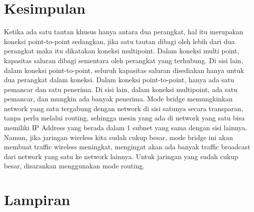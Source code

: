 \section{Kesimpulan}
Ketika ada satu tautan khusus hanya antara dua perangkat, hal itu merupakan koneksi point-to-point sedangkan, jika satu tautan dibagi oleh lebih dari dua perangkat maka itu dikatakan koneksi multipoint. Dalam koneksi multi point, kapasitas saluran dibagi sementara oleh perangkat yang terhubung. Di sisi lain, dalam koneksi point-to-point, seluruh kapasitas saluran disediakan hanya untuk dua perangkat dalam koneksi. Dalam koneksi point-to-point, hanya ada satu pemancar dan satu penerima. Di sisi lain, dalam koneksi multipoint, ada satu pemancar, dan mungkin ada banyak penerima. Mode bridge memungkinkan network yang satu tergabung dengan network di sisi satunya secara transparan, tanpa perlu melalui routing, sehingga mesin yang ada di network yang satu bisa memiliki IP Address yang berada dalam 1 subnet yang sama dengan sisi lainnya. Namun, jika jaringan wireless kita sudah cukup besar, mode bridge ini akan membuat traffic wireless meningkat, mengingat akan ada banyak traffic broadcast dari network yang satu ke network lainnya. Untuk jaringan yang sudah cukup besar, disarankan menggunakan  mode routing.

\section{Lampiran}

